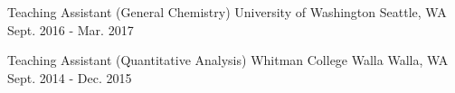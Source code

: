 


\begin{cventries}


\cventry
{Teaching Assistant (General Chemistry)} %
{University of Washington} %
{Seattle, WA} %
{Sept. 2016 - Mar. 2017} %
{ %
}


\cventry
{Teaching Assistant (Quantitative Analysis)} %
{Whitman College} %
{Walla Walla, WA} %
{Sept. 2014 - Dec. 2015} %
{ %
}



\end{cventries}
